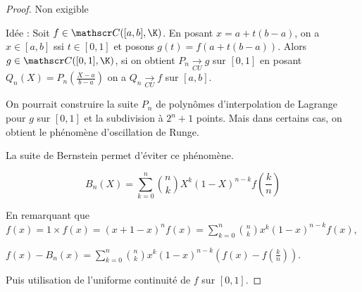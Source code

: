 \begin{proof}
    Non exigible 

    Idée : Soit $f \in \mathscr C([a, b], \K)$. En posant $x = a + t (b - a)$, on a 
    $x \in [a, b]$ ssi $t \in [0, 1]$ et posons $g(t) = f(a + t (b - a))$. 
    Alors $g \in \mathscr C([0, 1], \K)$, si on obtient $P_n \xrightarrow[CU]{} g$ sur $[0, 1]$
    en posant $Q_n(X) = P_n \left( \frac{X - a}{b - a} \right)$ on a $Q_n \xrightarrow[CU]{} f$ sur $[a, b]$.

    On pourrait construire la suite $P_n$ de polynômes d'interpolation de Lagrange pour 
    $g$ sur $[0, 1]$ et la subdivision à $2^{n} + 1$ points. Mais dans certains cas, on obtient 
    le phénomène d'oscillation de Runge.

    La suite de Bernstein permet d'éviter ce phénomène.

    $$B_n(X) = \sum_{k = 0}^{n} \binom{n}{k} X^k (1 - X)^{n - k} f\left( \frac k n \right)$$

    En remarquant que $\displaystyle f(x) = 1 \times f(x) = (x + 1 - x)^n f(x) = \sum_{k = 0}^{n} \binom{n}{k} x^k (1 - x)^{n - k} f(x)$,

    $\displaystyle f(x) - B_n(x) = \sum_{k = 0}^{n} \binom{n}{k} x^k (1 - x)^{n - k} \left( f(x) - f\left( \frac k n \right) \right)$.

    Puis utilisation de l'uniforme continuité de $f$ sur $[0, 1]$.
\end{proof}


